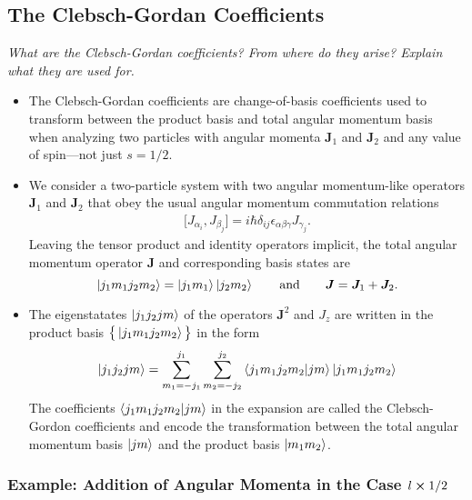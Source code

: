 \documentclass[11pt, a4paper]{article}
\renewcommand{\vec}[1]{\bm{#1}}  %
\newcommand{\J}{\vec{J}}  %
\begin{document}
\subsection{The Clebsch-Gordan Coefficients}
\textit{What are the Clebsch-Gordan coefficients? From where do they arise? Explain what they are used for.}

\begin{itemize}
    \item The Clebsch-Gordan coefficients are change-of-basis coefficients used to transform between the product basis and total angular momentum basis when analyzing two particles with angular momenta $ \J_{1} $ and $ \J_{2} $ and any value of spin---not just $ s = 1/2 $.

    \item We consider a two-particle system with two angular momentum-like operators $ \J_{1} $ and $ \J_{2} $ that obey the usual angular momentum commutation relations
    \begin{align*}
        \big[ J_{\alpha_{i}}, J_{\beta_{j}} \big] = i \hbar \delta_{ij}\epsilon_{\alpha\beta\gamma}J_{\gamma_{j}}.
    \end{align*}
    Leaving the tensor product and identity operators implicit, the total angular momentum operator $ \J $ and corresponding basis states are
    \begin{equation*}
        \ket{j_{1}m_{1}j_{2}m_{2}} = \ket{j_{1}m_{1}}\ket{j_{2}m_{2}} \qquad \text{and} \qquad \J = \J_{1} + \J_{2}.
    \end{equation*}
 
    \item The eigenstatates $ \ket{j_{1}j_{2}jm} $ of the operators $ \J^{2} $ and $ J_{z} $ are written in the product basis $ \big\{ \ket{j_{1}m_{1}j_{2}m_{2}} \big\} $ in the form
    \begin{equation*}
        \ket{j_{1}j_{2}jm} = \sum_{m_{1} = - j_{1}}^{j_{1}}\sum_{m_{2} = - j_{2}}^{j_{2}} \braket{j_{1}m_{1}j_{2}m_{2}}{jm} \ket{j_{1}m_{1}j_{2}m_{2}}
    \end{equation*}
    The coefficients $ \braket{j_{1}m_{1}j_{2}m_{2}}{jm} $ in the expansion are called the Clebsch-Gordon coefficients and encode the transformation between the total angular momentum basis $ \ket{jm} $ and the product basis $ \ket{m_{1}m_{2}} $. 

\end{itemize}

\subsubsection{Example: Addition of Angular Momenta in the Case $ l \cross 1/2 $}
\end{document}
